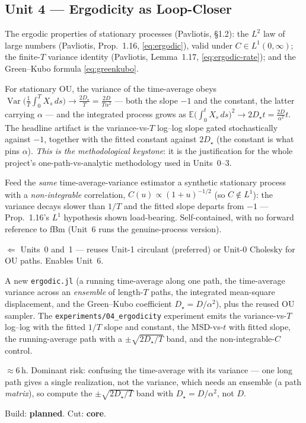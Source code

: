 \documentclass[11pt]{article}
\newcommand{\pav}[1]{{\small\color{hubblue}(Pavliotis, #1)}}
\newcommand{\Dstar}{D_{\star}}
\newenvironment{brief}{%
  \begin{description}[style=sameline,leftmargin=2.3cm,font=\bfseries\color{hubblue}]
}{%
  \end{description}
}
\begin{document}
\subsection*{Unit 4 --- Ergodicity as Loop-Closer}
\begin{brief}
\item[Idea] The ergodic properties of stationary processes \pav{\S1.2}: the $L^2$ law of large
numbers \pav{Prop.~1.16, \eqref{eq:ergodic}}, valid under $C\in L^1(0,\infty)$; the finite-$T$
variance identity \pav{Lemma~1.17, \eqref{eq:ergodic-rate}}; and the Green--Kubo formula
\eqref{eq:greenkubo}.
\item[Proves] For stationary OU, the variance of the time-average obeys
$\operatorname{Var}\!\big(\tfrac1T\int_0^T X_s\,ds\big)\to \tfrac{2\Dstar}{T}=\tfrac{2D}{T\alpha^2}$
--- both the slope $-1$ and the constant, the latter carrying $\alpha$ --- and the integrated process
grows as $\mathbb{E}\big(\int_0^t X_s\,ds\big)^2\to 2\Dstar t = \tfrac{2D}{\alpha^2}t$. The headline
artifact is the variance-vs-$T$ log--log slope gated stochastically against $-1$, together with the
fitted constant against $2\Dstar$ (the constant is what pins $\alpha$). \emph{This is the
methodological keystone}: it is the justification for the whole project's one-path-vs-analytic
methodology used in Units~0--3.
\item[Falsifier] Feed the \emph{same} time-average-variance estimator a synthetic stationary process
with a \emph{non-integrable} correlation, $C(u)\propto(1+u)^{-1/2}$ (so $C\notin L^1$): the variance
decays slower than $1/T$ and the fitted slope departs from $-1$ --- Prop.~1.16's $L^1$ hypothesis
shown load-bearing. Self-contained, with no forward reference to fBm (Unit~6 runs the genuine-process
version).
\item[Depends on / enables] $\Leftarrow$ Units~0 and~1 --- reuses Unit-1 circulant (preferred) or
Unit-0 Cholesky for OU paths. Enables Unit~6.
\item[Deliverable shape] A new \texttt{ergodic.jl} (a running time-average along one path, the
time-average variance across an \emph{ensemble} of length-$T$ paths, the integrated mean-square
displacement, and the Green--Kubo coefficient $\Dstar=D/\alpha^2$), plus the reused OU sampler. The
\texttt{experiments/04\_ergodicity} experiment emits the variance-vs-$T$ log--log with the fitted
$1/T$ slope and constant, the MSD-vs-$t$ with fitted slope, the running-average path with a
$\pm\sqrt{2\Dstar/T}$ band, and the non-integrable-$C$ control.
\item[Effort \& risk] $\approx 6$\,h. Dominant risk: confusing the time-average with its variance ---
one long path gives a single realization, not the variance, which needs an ensemble (a path
\emph{matrix}), so compute the $\pm\sqrt{2\Dstar/T}$ band with $\Dstar=D/\alpha^2$, not $D$.
\item[Status] Build: \textbf{planned}. Cut: \textbf{core}.
\end{brief}
\end{document}
